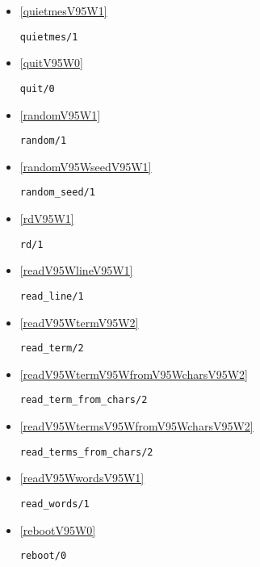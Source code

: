 \begin{itemize}
\item \ref{quietmesV95W1} 
\begin{verbatim}
quietmes/1
\end{verbatim}

\item \ref{quitV95W0} 
\begin{verbatim}
quit/0
\end{verbatim}

\item \ref{randomV95W1} 
\begin{verbatim}
random/1
\end{verbatim}

\item \ref{randomV95WseedV95W1} 
\begin{verbatim}
random_seed/1
\end{verbatim}

\item \ref{rdV95W1} 
\begin{verbatim}
rd/1
\end{verbatim}

\item \ref{readV95WlineV95W1} 
\begin{verbatim}
read_line/1
\end{verbatim}

\item \ref{readV95WtermV95W2} 
\begin{verbatim}
read_term/2
\end{verbatim}

\item \ref{readV95WtermV95WfromV95WcharsV95W2} 
\begin{verbatim}
read_term_from_chars/2
\end{verbatim}

\item \ref{readV95WtermsV95WfromV95WcharsV95W2} 
\begin{verbatim}
read_terms_from_chars/2
\end{verbatim}

\item \ref{readV95WwordsV95W1} 
\begin{verbatim}
read_words/1
\end{verbatim}

\item \ref{rebootV95W0} 
\begin{verbatim}
reboot/0
\end{verbatim}


\end{itemize}
